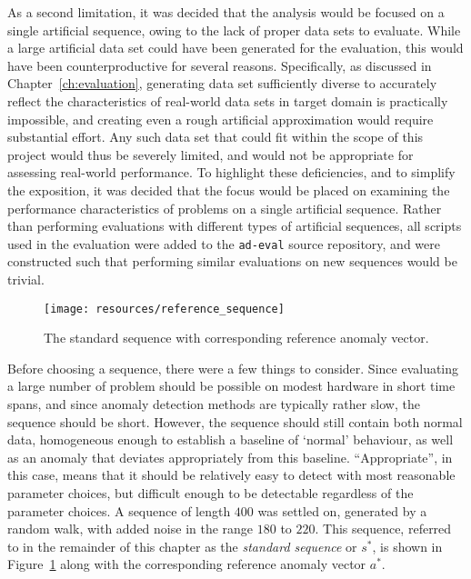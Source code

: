 As a second limitation, it was decided that the analysis would be focused on a single artificial sequence, owing to the lack of proper data sets to evaluate.
While a large artificial data set could have been generated for the evaluation, this would have been counterproductive for several reasons.
Specifically, as discussed in Chapter~\ref{ch:evaluation}, generating data set sufficiently diverse to accurately reflect the characteristics of real-world data sets in target domain is practically impossible, and creating even a rough artificial approximation would require substantial effort.
Any such data set that could fit within the scope of this project would thus be severely limited, and would not be appropriate for assessing real-world performance.
To highlight these deficiencies, and to simplify the exposition, it was decided that the focus would be placed on examining the performance characteristics of problems on a single artificial sequence.
Rather than performing evaluations with different types of artificial sequences, all scripts used in the evaluation were added to the \texttt{ad-eval} source repository, and were constructed such that performing similar evaluations on new sequences would be trivial.

\begin{figure}[h]
    \vspace{-10pt}
    \begin{center}
        \texttt{[image: resources/reference\_sequence]}
    \end{center}
    \vspace{-20pt}
    \caption{\small{The standard sequence with corresponding reference anomaly vector.}}
\label{fig:reference_sequence}
    \vspace{-10pt}
\end{figure}

Before choosing a sequence, there were a few things to consider. Since evaluating a large number of problem should be possible on modest hardware in short time spans, and since anomaly detection methods are typically rather slow, the sequence should be short. However, the sequence should still contain both normal data, homogeneous enough to establish a baseline of `normal' behaviour, as well as an anomaly that deviates appropriately from this baseline. ``Appropriate'', in this case, means that it should be relatively easy to detect with most reasonable parameter choices, but difficult enough to be detectable regardless of the parameter choices. A sequence of length $400$ was settled on, generated by a random walk, with added noise in the range $180$ to $220$. This sequence, referred to in the remainder of this chapter as the \emph{standard sequence} or $s^*$, is shown in Figure~\ref{fig:reference_sequence} along with the corresponding reference anomaly vector $a^*$.

